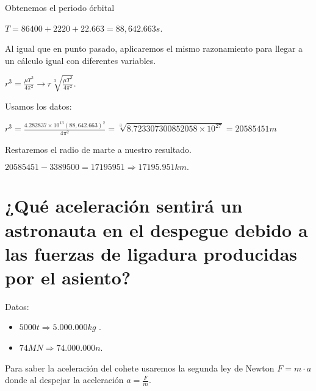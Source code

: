 \documentclass[a4paper,12pt]{article}
\begin{document}
\vspace{\baselineskip}
\begin{justify}
    Obtenemos el periodo órbital
\end{justify}

\(T = 86400 + 2220 +22.663 = 88,642.663 s\).
\vspace{\baselineskip}

\begin{justify}
    Al igual que en punto pasado, aplicaremos el mismo razonamiento para llegar a un cálculo igual con diferentes variables.
\end{justify}
\vspace{\baselineskip}

\(r^3 = \frac{\mu T^2}{4\pi^2} \rightarrow r \sqrt[3]{\frac{\mu T^2}{4\pi^2}}\).

\begin{justify}
    Usamos los datos:
\end{justify}
\(r^3 = \frac{4.282837 \times 10^{13}\left(88,642.663\right)^2}{4\pi^2} = \sqrt[3]{8.723307300852058 \times 10^{27}} = 20585451m\)

\begin{justify}
    Restaremos el radio de marte a nuestro resultado.
\end{justify}
\vspace{\baselineskip}

\(20585451 - 3389500 = 17195951 \Rightarrow 17195.951 km.\)

\section{¿Qué aceleración sentirá un astronauta en el despegue debido a las fuerzas de ligadura producidas por el asiento?}
\vspace{\baselineskip}

\begin{justify}
    Datos:
\end{justify}

\begin{itemize}
    \item \(5000 t \Rightarrow  5.000.000 kg\) .
    \item \(74 MN \Rightarrow 74.000.000 n\).
\end{itemize}
\vspace{\baselineskip}

\begin{justify}
    Para saber la aceleración del cohete usaremos la segunda ley de Newton \(F = m \cdot a \)
    donde al despejar la aceleración \(a = \frac{F}{m}\).
\end{justify}
\end{document}
